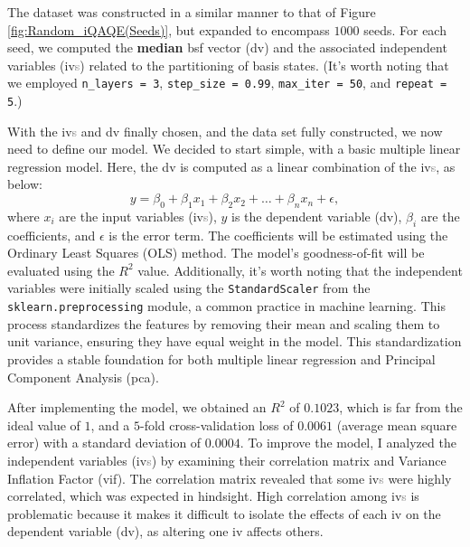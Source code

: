 The dataset was constructed in a similar manner to that of Figure \ref{fig:Random_iQAQE(Seeds)}, but expanded to encompass $1000$ seeds. For each seed, we computed the \textbf{median} \acrshort{bsf} vector (\acrshort{dv}) and the associated independent variables (\acrshort{iv}\textcolor{gray}{s}) related to the partitioning of basis states. (It's worth noting that we employed \texttt{n\_layers = 3}, \texttt{step\_size = 0.99}, \texttt{max\_iter = 50}, and \texttt{repeat = 5}.)

With the \acrshort{iv}\textcolor{gray}{s} and \acrshort{dv} finally chosen, and the data set fully constructed, we now need to define our model. We decided to start simple, with a basic multiple linear regression model. Here, the \acrshort{dv} is computed as a linear combination of the \acrshort{iv}\textcolor{gray}{s}, as below:
\begin{equation}
    y = \beta_0 + \beta_1 x_1 + \beta_2 x_2 + \ldots + \beta_n x_n + \epsilon,
\end{equation}
where $x_i$ are the input variables (\acrshort{iv}\textcolor{gray}{s}), $y$ is the dependent variable (\acrshort{dv}), $\beta_i$ are the coefficients, and $\epsilon$ is the error term. The coefficients will be estimated using the Ordinary Least Squares (OLS) method. The model's goodness-of-fit will be evaluated using the $R^2$ value. Additionally, it's worth noting that the independent variables were initially scaled using the \texttt{StandardScaler} from the \texttt{sklearn.preprocessing} module, a common practice in machine learning. This process standardizes the features by removing their mean and scaling them to unit variance, ensuring they have equal weight in the model. This standardization provides a stable foundation for both multiple linear regression and Principal Component Analysis (\acrshort{pca}).

After implementing the model, we obtained an $R^2$ of $0.1023$, which is far from the ideal value of $1$, and a $5$-fold cross-validation loss of $0.0061$ (average mean square error) with a standard deviation of $0.0004$. To improve the model, I analyzed the independent variables (\acrshort{iv}\textcolor{gray}{s}) by examining their correlation matrix and Variance Inflation Factor (\acrshort{vif}). The correlation matrix revealed that some \acrshort{iv}\textcolor{gray}{s} were highly correlated, which was expected in hindsight. High correlation among \acrshort{iv}\textcolor{gray}{s} is problematic because it makes it difficult to isolate the effects of each \acrshort{iv} on the dependent variable (\acrshort{dv}), as altering one \acrshort{iv} affects others.

